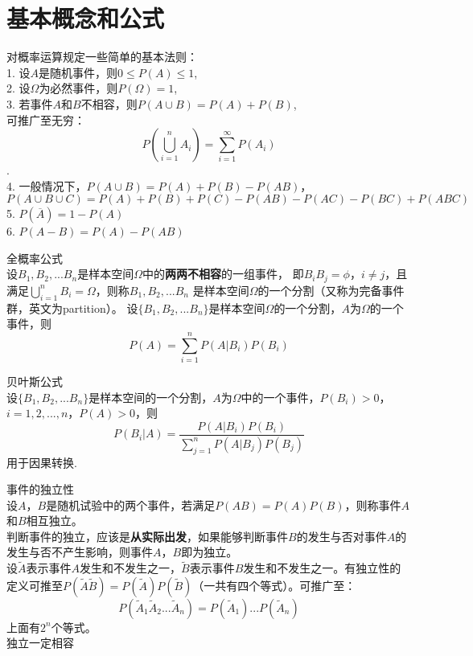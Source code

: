 \section{基本概念和公式}
对概率运算规定一些简单的基本法则：\\
1. 设$A$是随机事件，则$0 \leq P(A) \leq 1$,\\
2. 设$\Omega$为必然事件，则$P(\Omega)=1$,\\
3. 若事件$A$和$B$不相容，则$P(A\cup B)=P(A)+P(B)$,\\
可推广至无穷：$$P(\bigcup_{i=1}^{n}A_i)=\sum_{i=1}^{\infty}P(A_i)$$.\\
4. 一般情况下，$P(A\cup B)=P(A)+P(B)-P(AB)$，$P(A\cup B \cup C)=P(A)+P(B)+P(C)-P(AB)-P(AC)-P(BC)+P(ABC)$ \\
5. $P(\overline{A})=1-P(A)$\\
6. $P(A-B)=P(A)-P(AB)$\\

\begin{theorem}全概率公式\\
  设$B_1,B_2,...B_n$是样本空间$\Omega$中的\textbf{两两不相容}的一组事件，
  即$B_i B_j=\phi$，$i\neq j$，且满足$\bigcup_{i=1}^{n}B_i=\Omega$，则称$B_1,B_2,...B_n$
  是样本空间$\Omega$的一个分割（又称为完备事件群，英文为partition）。
  设$\{B_1,B_2,...B_n\}$是样本空间$\Omega$的一个分割，$A$为$\Omega$的一个事件，则
  $$
  P(A)=\sum_{i=1}^{n}P(A|B_i)P(B_i)
  $$
\end{theorem}

\begin{theorem}贝叶斯公式\\
  设$\{B_1, B_2, ...B_n\}$是样本空间的一个分割，$A$为$\Omega$中的一个事件，$P(B_i)>0$，$i=1,2,...,n$，$P(A)>0$，则
$$
P(B_i|A)=\frac{P(A|B_i)P(B_i)}{\sum_{j=1}^{n}P(A|B_j)P(B_j)}
$$
用于因果转换.
\end{theorem}

\begin{definition}事件的独立性\\
  设$A$，$B$是随机试验中的两个事件，若满足$P(AB)=P(A)P(B)$，则称事件$A$和$B$相互独立。\\
  判断事件的独立，应该是\textbf{从实际出发}，如果能够判断事件$B$的发生与否对事件$A$的发生与否不产生影响，则事件$A$，$B$即为独立。\\
  设$\widetilde{A}$表示事件$A$发生和不发生之一，$\widetilde{B}$表示事件$B$发生和不发生之一。有独立性的定义可推至$P(\widetilde{A}\widetilde{B})=P(\widetilde{A})P(\widetilde{B})$（一共有四个等式）。可推广至：
$$
P(\widetilde{A}_1\widetilde{A}_2...\widetilde{A}_n)=P(\widetilde{A}_1)...P(\widetilde{A}_n)
$$
上面有$2^n$个等式。\\
独立一定相容
\end{definition}

